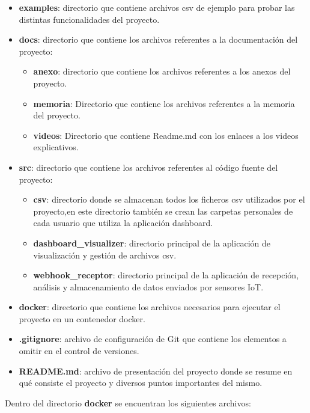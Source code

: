 \begin{itemize}
    \item \textbf{examples}: directorio que contiene archivos csv de ejemplo para probar las distintas funcionalidades del proyecto.
   \item \textbf{docs}: directorio que contiene los archivos referentes a la documentación del proyecto:
   \begin{itemize}
       \item \textbf{anexo}: directorio que contiene los archivos referentes a los anexos del proyecto.
       \item \textbf{memoria}: Directorio que contiene los archivos referentes a la memoria del proyecto.
       \item \textbf{videos}: Directorio que contiene Readme.md con los enlaces a los videos explicativos.
   \end{itemize}
    \item \textbf{src}: directorio que contiene los archivos referentes al código fuente del proyecto:
    \begin{itemize}
       \item \textbf{csv}: directorio donde se almacenan todos los ficheros csv utilizados por el proyecto,en este directorio también se crean las carpetas personales de cada usuario que utiliza la aplicación dashboard.
       \item \textbf{dashboard\_visualizer}: directorio principal de la aplicación de visualización y gestión de archivos csv.
       \item \textbf{webhook\_receptor}: directorio principal de la aplicación de recepción, análisis y almacenamiento de datos  enviados por sensores IoT.
   \end{itemize}
   
   \item \textbf{docker}: directorio que contiene los archivos necesarios para ejecutar el proyecto en un contenedor docker.

   \item \textbf{.gitignore}: archivo de configuración de Git que contiene los elementos a omitir en el control de versiones.

   \item \textbf{README.md}: archivo de presentación del proyecto donde se resume en qué consiste el proyecto y diversos puntos importantes del mismo.
   
\end{itemize}

Dentro del directorio \textbf{docker} se encuentran los siguientes archivos:

